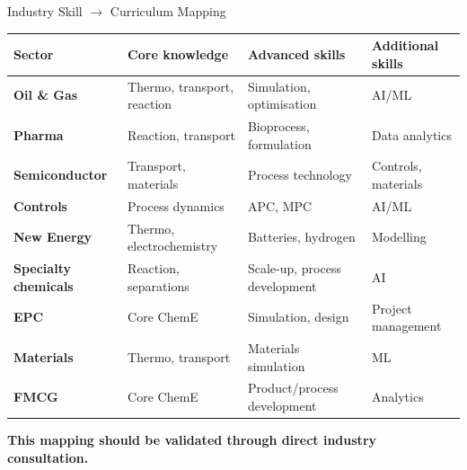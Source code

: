 \documentclass[aspectratio=169,11pt]{beamer}
\newcommand{\key}[1]{\textbf{\color{IITblue}#1}}
\begin{document}
\begin{frame}{Industry Skill $\rightarrow$ Curriculum Mapping}
\scriptsize
\begin{tabularx}{\textwidth}{>{\bfseries}p{2.2cm} p{3.1cm} p{4.0cm} X}
\toprule
Sector & Core knowledge & Advanced skills & Additional skills \\
\midrule
Oil \& Gas & Thermo, transport, reaction & Simulation, optimisation & AI/ML \\
Pharma & Reaction, transport & Bioprocess, formulation & Data analytics \\
Semiconductor & Transport, materials & Process technology & Controls, materials \\
Controls & Process dynamics & APC, MPC & AI/ML \\
New Energy & Thermo, electrochemistry & Batteries, hydrogen & Modelling \\
Specialty chemicals & Reaction, separations & Scale-up, process development & AI \\
EPC & Core ChemE & Simulation, design & Project management \\
Materials & Thermo, transport & Materials simulation & ML \\
FMCG & Core ChemE & Product/process development & Analytics \\
\bottomrule
\end{tabularx}
\vspace{2mm}
\centering\key{This mapping should be validated through direct industry consultation.}
\end{frame}
\end{document}
